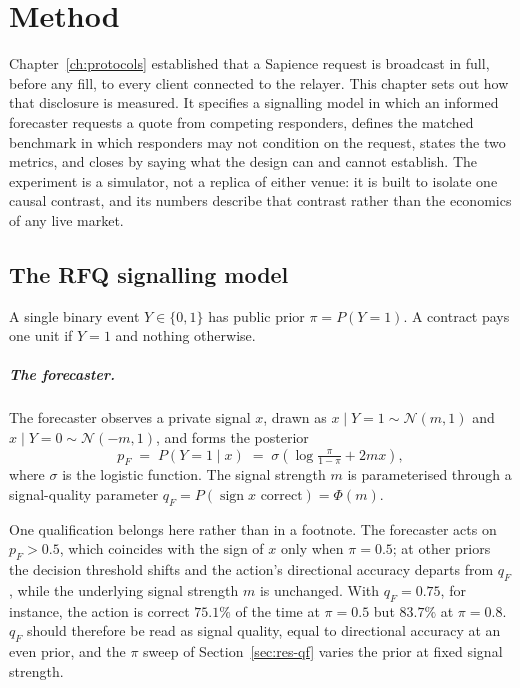 \chapter{Method}
\label{ch:method}

Chapter~\ref{ch:protocols} established that a Sapience request is broadcast in full, before
any fill, to every client connected to the relayer. This chapter sets out how that
disclosure is measured. It specifies a signalling model in which an informed forecaster
requests a quote from competing responders, defines the matched benchmark in which
responders may not condition on the request, states the two metrics, and closes by saying
what the design can and cannot establish. The experiment is a simulator, not a replica of
either venue: it is built to isolate one causal contrast, and its numbers describe that
contrast rather than the economics of any live market.

\section{The RFQ signalling model}
\label{sec:model}

A single binary event $Y \in \{0,1\}$ has public prior $\pi = P(Y=1)$. A contract pays one
unit if $Y=1$ and nothing otherwise.

\paragraph{The forecaster.} The forecaster observes a private signal $x$, drawn as
$x \mid Y=1 \sim \mathcal{N}(m, 1)$ and $x \mid Y=0 \sim \mathcal{N}(-m, 1)$, and forms the
posterior
\[
p_F \;=\; P(Y=1 \mid x) \;=\; \sigma\!\left(\log\tfrac{\pi}{1-\pi} + 2mx\right),
\]
where $\sigma$ is the logistic function. The signal strength $m$ is parameterised through
a signal-quality parameter $q_F = P(\operatorname{sign} x \text{ correct}) = \Phi(m)$.

One qualification belongs here rather than in a footnote. The forecaster acts on
$p_F > 0.5$, which coincides with the sign of $x$ only when $\pi = 0.5$; at other priors the
decision threshold shifts and the action's directional accuracy departs from $q_F$, while
the underlying signal strength $m$ is unchanged. With $q_F = 0.75$, for instance, the action
is correct $75.1\%$ of the time at $\pi = 0.5$ but $83.7\%$ at $\pi = 0.8$. $q_F$ should
therefore be read as signal quality, equal to directional accuracy at an even prior, and the
$\pi$ sweep of Section~\ref{sec:res-qf} varies the prior at fixed signal strength.


